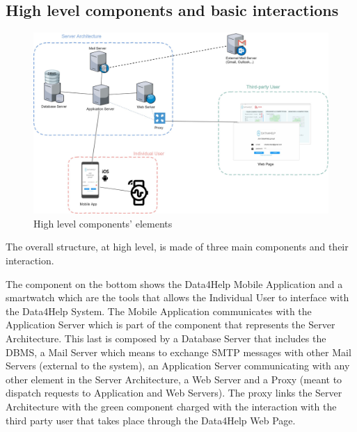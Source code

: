 \subsection{High level components and basic interactions}
\label{subsect:highLevel}
\begin{figure}[h]
\caption{High level components' elements}
\includegraphics[width = \textwidth]{sections/architecturalDesign/overview_1.jpg}
\end{figure}

The overall structure, at high level, is made of three main components and their interaction. 

The component on the bottom shows the Data4Help Mobile Application and a smartwatch which are the tools that allows the Individual User to interface with the Data4Help System. The Mobile Application communicates with the Application Server which is part of the component that represents the Server Architecture. 
This last is composed by a Database Server that includes the DBMS, a Mail Server which means to exchange SMTP messages with other Mail Servers (external to the system), an Application Server communicating with any other element in the Server Architecture, a Web Server and a Proxy (meant to dispatch requests to Application and Web Servers). 
The proxy links the Server Architecture with the green component charged with the interaction with the third party user that takes place through the Data4Help Web Page. 

